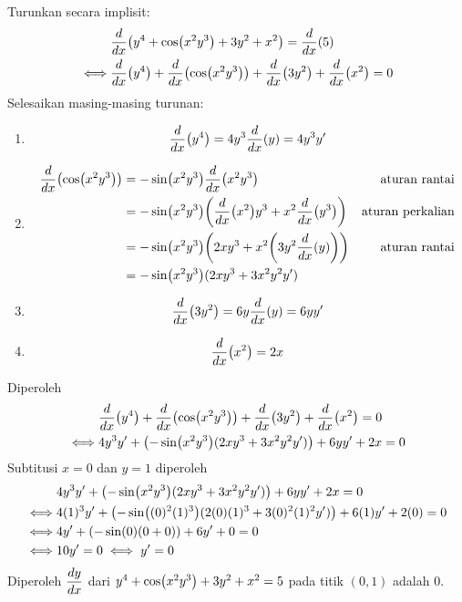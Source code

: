 \begin{enumerate}[leftmargin=*, label={\arabic*}.]
\begin{enumerate}[label={\alph*}.]
    Turunkan secara implisit:
    \begin{align*}
        &\drv{x}{y^{4}+\cos\brk*{x^{2}y^{3}}+3y^{2}+x^{2}}=\drv{x}{5}\\
        \iff &\drv{x}{y^{4}}+\drv{x}{\cos\brk*{x^{2}y^{3}}}
        +\drv{x}{3y^{2}}+\drv{x}{x^{2}} = 0
    \end{align*}
    Selesaikan masing-masing turunan:
    \begin{enumerate}[label={\arabic*})]
    \item \[
    \drv{x}{y^{4}} = 4y^{3}\drv{x}{y} = 4y^{3}y'
    \]
    \item \begin{align*}
        \drv{x}{\cos\brk*{x^{2}y^{3}}} 
        &= -\sin\brk*{x^{2}y^{3}}\drv{x}{x^{2}y^{3}}
        &\text{aturan rantai}\\
        &= -\sin\brk*{x^{2}y^{3}}\brk*{\drv{x}{x^{2}}y^{3}+x^{2}\drv{x}{y^{3}}}
        &\text{aturan perkalian}\\
        &= -\sin\brk*{x^{2}y^{3}}\brk*{2xy^{3}+x^{2}\brk*{3y^{2}\drv{x}{y}}}
        &\text{aturan rantai}\\
        &= -\sin\brk*{x^{2}y^{3}}(2xy^{3}+3x^{2}y^{2}y')
    \end{align*}
    \item \[
    \drv{x}{3y^{2}} = 6y\drv{x}{y} = 6yy'
    \]
    \item \[
    \drv{x}{x^{2}} = 2x
    \]
    \end{enumerate}
    Diperoleh
    \begin{align*}
        &\drv{x}{y^{4}}+\drv{x}{\cos\brk*{x^{2}y^{3}}}
        +\drv{x}{3y^{2}}+\drv{x}{x^{2}} = 0\\
        \iff &4y^{3}y'
        +\brk*{-\sin\brk*{x^{2}y^{3}}(2xy^{3}+3x^{2}y^{2}y')}+6yy'+2x=0
    \end{align*}
    Subtitusi $x=0$ dan $y=1$ diperoleh
    \begin{align*}
        &4y^{3}y'
        +\brk*{-\sin\brk*{x^{2}y^{3}}(2xy^{3}+3x^{2}y^{2}y')}+6yy'+2x=0\\
        \iff &4(1)^{3}y'
        +\brk*{-\sin\brk*{(0)^{2}(1)^{3}}(2(0)(1)^{3}+3(0)^{2}(1)^{2}y')}+6(1)y'
        +2(0)=0\\
        \iff &4y'+(-\sin(0)(0+0))+6y'+0=0 \\
        \iff &10y'=0 \iff y'=0
    \end{align*}
    Diperoleh $\displaystyle\frac{dy}{dx}$ dari 
    $y^{4}+\cos\brk*{x^{2}y^{3}}+3y^{2}+x^{2}=5$ pada titik $(0,1)$ adalah $0$.


\end{enumerate}
\end{enumerate}
